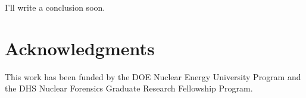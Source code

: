\documentclass{anstrans}
\begin{document}
I'll write a conclusion soon. 

\section{Acknowledgments}
This work has been funded by the \gls{DOE} Nuclear Energy University Program and the \gls{DHS} Nuclear Forensics Graduate Research Fellowship Program. 

\cite{Lar2008}



\end{document}
